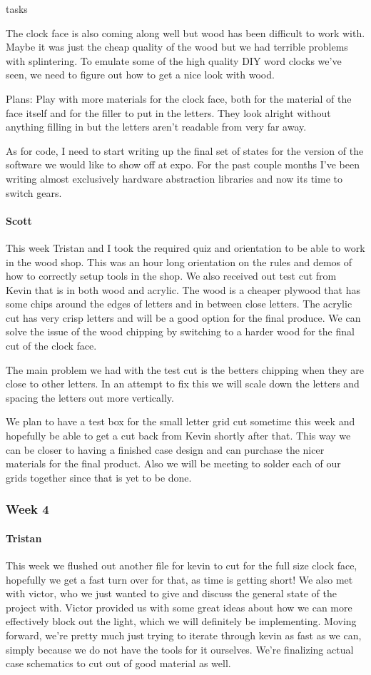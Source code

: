 tasks\documentclass[onecolumn, draftclsnofoot,10pt, compsoc]{IEEEtran}
\begin{document}
The clock face is also coming along well but wood has been difficult to work with. Maybe it was just the cheap quality of the wood but we had terrible problems with splintering. To emulate some of the high quality DIY word clocks we've seen, we need to figure out how to get a nice look with wood.

Plans: Play with more materials for the clock face, both for the material of the face itself and for the filler to put in the letters. They look alright without anything filling in but the letters aren't readable from very far away.

As for code, I need to start writing up the final set of states for the version of the software we would like to show off at expo. For the past couple months I've been writing almost exclusively hardware abstraction libraries and now its time to switch gears.
\paragraph{Scott}
This week Tristan and I took the required quiz and orientation to be able to work in the wood shop. This was an hour long orientation on the rules and demos of how to correctly setup tools in the shop. We also received out test cut from Kevin that is in both wood and acrylic. The wood is a cheaper plywood that has some chips around the edges of letters and in between close letters. The acrylic cut has very crisp letters and will be a good option for the final produce. We can solve the issue of the wood chipping by switching to a harder wood for the final cut of the clock face.

The main problem we had with the test cut is the betters chipping when they are close to other letters. In an attempt to fix this we will scale down the letters and spacing the letters out more vertically.

We plan to have a test box for the small letter grid cut sometime this week and hopefully be able to get a cut back from Kevin shortly after that. This way we can be closer to having a finished case design and can purchase the nicer materials for the final product. Also we will be meeting to solder each of our grids together since that is yet to be done.
\subsubsection{Week 4}
\paragraph{Tristan}
This week we flushed out another file for kevin to cut for the full size clock face, hopefully we get a fast turn over for that, as time is getting short! We also met with victor, who we just wanted to give and discuss the general state of the project with. Victor provided us with some great ideas about how we can more effectively block out the light, which we will definitely be implementing. Moving forward, we're pretty much just trying to iterate through kevin as fast as we can, simply because we do not have the tools for it ourselves. We're finalizing actual case schematics to cut out of good material as well.
\end{document}
